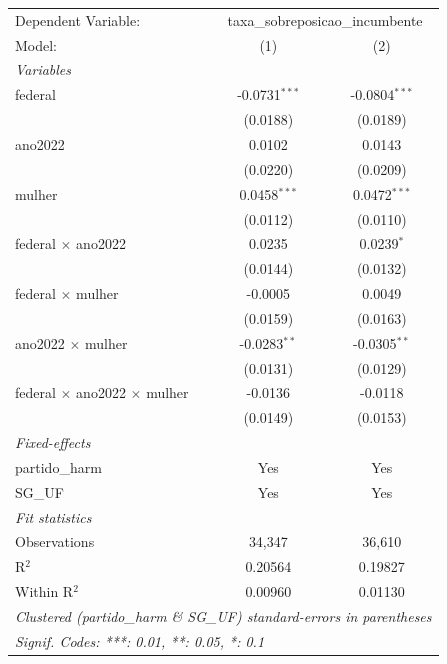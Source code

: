 
\begingroup
\centering
\begin{tabular}{lcc}
   \tabularnewline \midrule \midrule
   Dependent Variable: & \multicolumn{2}{c}{taxa\_sobreposicao\_incumbente}\\
   Model:                                     & (1)             & (2)\\  
   \midrule
   \emph{Variables}\\
   federal                                    & -0.0731$^{***}$ & -0.0804$^{***}$\\   
                                              & (0.0188)        & (0.0189)\\   
   ano2022                                    & 0.0102          & 0.0143\\   
                                              & (0.0220)        & (0.0209)\\   
   mulher                                     & 0.0458$^{***}$  & 0.0472$^{***}$\\   
                                              & (0.0112)        & (0.0110)\\   
   federal $\times$ ano2022                   & 0.0235          & 0.0239$^{*}$\\   
                                              & (0.0144)        & (0.0132)\\   
   federal $\times$ mulher                    & -0.0005         & 0.0049\\   
                                              & (0.0159)        & (0.0163)\\   
   ano2022 $\times$ mulher                    & -0.0283$^{**}$  & -0.0305$^{**}$\\   
                                              & (0.0131)        & (0.0129)\\   
   federal $\times$ ano2022 $\times$ mulher   & -0.0136         & -0.0118\\   
                                              & (0.0149)        & (0.0153)\\   
   \midrule
   \emph{Fixed-effects}\\
   partido\_harm                              & Yes             & Yes\\  
   SG\_UF                                     & Yes             & Yes\\  
   \midrule
   \emph{Fit statistics}\\
   Observations                               & 34,347          & 36,610\\  
   R$^2$                                      & 0.20564         & 0.19827\\  
   Within R$^2$                               & 0.00960         & 0.01130\\  
   \midrule \midrule
   \multicolumn{3}{l}{\emph{Clustered (partido\_harm \& SG\_UF) standard-errors in parentheses}}\\
   \multicolumn{3}{l}{\emph{Signif. Codes: ***: 0.01, **: 0.05, *: 0.1}}\\
\end{tabular}
\par\endgroup



